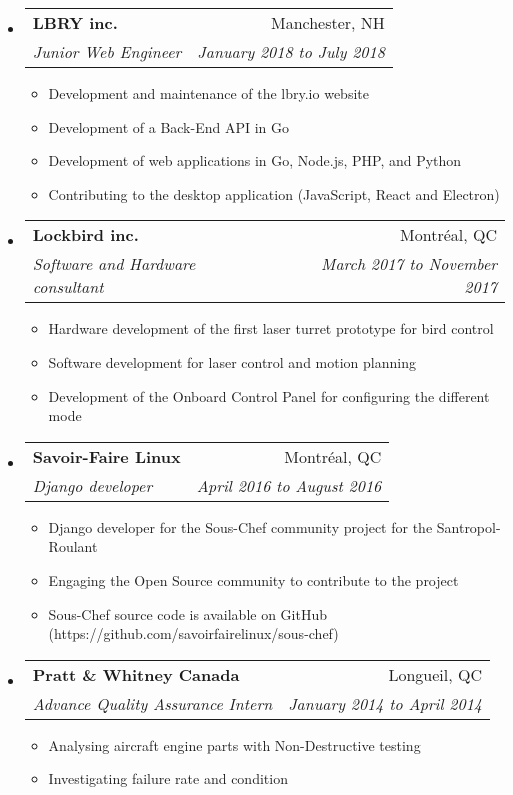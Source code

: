 \documentclass[letterpaper,11pt]{article}
\makeatletter
\newcommand{\ressubheading}[4]{
	\begin{tabular*}{6.5in}{l@{\cftdotfill{\cftsecdotsep}\extracolsep{\fill}}r}
		\textbf{#1} & #2 \\
		\textit{#3} & \textit{#4} \\
	\end{tabular*}\vspace{-6pt}}
\makeatother
\begin{document}
\begin{itemize}
		\item
		\ressubheading{LBRY inc.}{Manchester, NH}{Junior Web Engineer}{January 2018 to July 2018}
		
		\begin{itemize}
			\item Development and maintenance of the lbry.io website
			\item Development of a Back-End API in Go
			\item Development of web applications in Go, Node.js, PHP, and Python
			\item Contributing to the desktop application (JavaScript, React and Electron)
		\end{itemize}
		
		\item
		\ressubheading{Lockbird inc.}{Montréal, QC}{Software and Hardware consultant}{March 2017 to November 2017}
		\begin{itemize}
			\item Hardware development of the first laser turret prototype for bird control
			\item Software development for laser control and motion planning
			\item Development of the Onboard Control Panel for  configuring the different mode
		\end{itemize}
		
		\item
		\ressubheading{Savoir-Faire Linux}{Montréal, QC}{Django developer}{April 2016 to August 2016}
		
		\begin{itemize}
			\item Django developer for the Sous-Chef community project for the Santropol-Roulant
			\item Engaging the Open Source community to contribute to the project
			\item Sous-Chef source code is available on GitHub (https://github.com/savoirfairelinux/sous-chef)
		\end{itemize}
		
		\item
		\ressubheading{Pratt \& Whitney Canada}{Longueil, QC}{Advance Quality Assurance Intern}{January 2014 to April 2014}
		
		\begin{itemize}
			\item Analysing aircraft engine parts with Non-Destructive testing
			\item Investigating failure rate and condition
		\end{itemize}
	\end{itemize}
	
\end{document}
